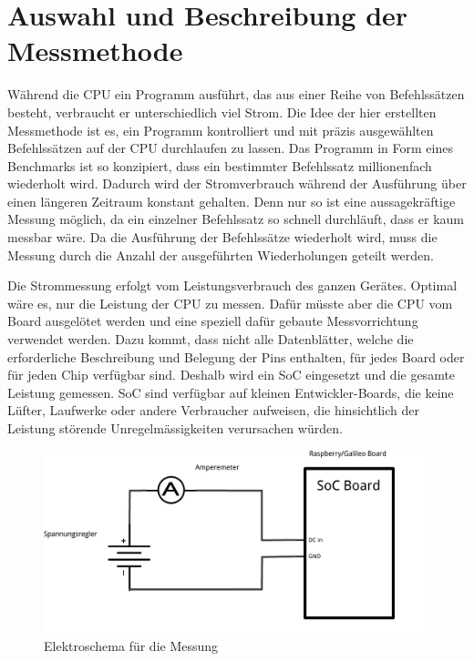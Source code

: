 \section{Auswahl und Beschreibung der Messmethode}
\label{chap:auswahl_beschreibung_methode}

Während die CPU ein Programm ausführt, das aus einer Reihe von Befehlssätzen besteht, verbraucht er unterschiedlich viel Strom. Die Idee der hier erstellten Messmethode ist es, ein Programm kontrolliert und mit präzis ausgewählten Befehlssätzen auf der CPU durchlaufen zu lassen. Das Programm in Form eines Benchmarks ist so konzipiert, dass ein bestimmter Befehlssatz millionenfach wiederholt wird. Dadurch wird der Stromverbrauch während der Ausführung über einen längeren Zeitraum konstant gehalten. Denn nur so ist eine aussagekräftige Messung möglich, da ein einzelner Befehlssatz so schnell durchläuft, dass er kaum messbar wäre. Da die Ausführung der Befehlssätze wiederholt wird, muss die Messung durch die Anzahl der ausgeführten Wiederholungen geteilt werden.
\par
Die Strommessung erfolgt vom Leistungsverbrauch des ganzen Gerätes. Optimal wäre es, nur die Leistung der CPU zu messen. Dafür müsste aber die CPU vom Board ausgelötet werden und eine speziell dafür gebaute Messvorrichtung verwendet werden. Dazu kommt, dass nicht alle Datenblätter, welche die erforderliche Beschreibung und Belegung der Pins enthalten, für jedes Board oder für jeden Chip verfügbar sind. Deshalb wird ein SoC eingesetzt und die gesamte Leistung gemessen. SoC sind verfügbar auf kleinen Entwickler-Boards, die keine Lüfter, Laufwerke oder andere Verbraucher aufweisen, die hinsichtlich der Leistung störende Unregelmässigkeiten verursachen würden.



\begin{figure}
\centering
\includegraphics[scale=0.5]{images/schema.pdf}
\caption{Elektroschema für die Messung}
\label{fig:Elektroschema}
\end{figure}


